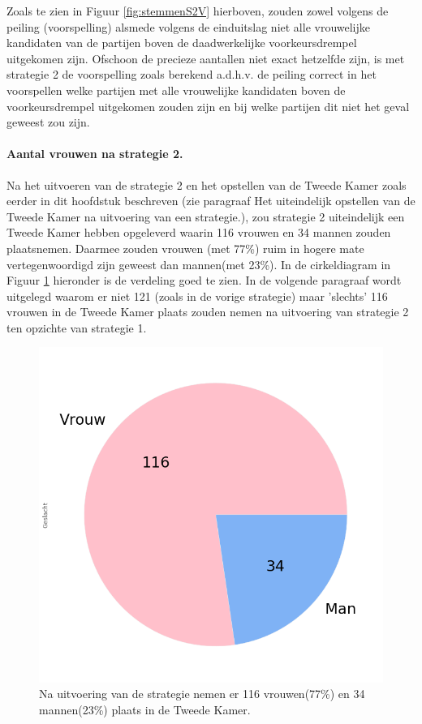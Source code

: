 Zoals te zien in Figuur \ref{fig:stemmenS2V}  hierboven, zouden zowel volgens de peiling (voorspelling) alsmede volgens de einduitslag niet alle vrouwelijke kandidaten van de partijen boven de daadwerkelijke voorkeursdrempel uitgekomen zijn. Ofschoon de precieze aantallen niet exact hetzelfde zijn, is met strategie 2 de voorspelling zoals berekend a.d.h.v. de peiling correct in het voorspellen welke partijen met alle vrouwelijke kandidaten boven de voorkeursdrempel uitgekomen zouden zijn en bij welke partijen dit niet het geval geweest zou zijn.




\paragraph{Aantal vrouwen na strategie 2.}
Na het uitvoeren van de strategie 2 en het opstellen van de Tweede Kamer zoals eerder in dit hoofdstuk beschreven (zie paragraaf Het uiteindelijk opstellen van de Tweede Kamer na uitvoering van een strategie.), zou strategie 2 uiteindelijk een Tweede Kamer hebben opgeleverd waarin 116 vrouwen en 34 mannen zouden plaatsnemen. Daarmee zouden vrouwen (met 77\%) ruim in hogere mate vertegenwoordigd zijn geweest dan mannen(met 23\%). In de cirkeldiagram in Figuur \ref{fig:pcS2V} hieronder is de verdeling goed te zien. In de volgende paragraaf wordt uitgelegd waarom er niet 121 (zoals in de vorige strategie) maar 'slechts' 116 vrouwen in de Tweede Kamer plaats zouden nemen na uitvoering van strategie 2 ten opzichte van strategie 1.

\begin{figure}[H]
\centering
	\includegraphics[width=0.35\linewidth]{pie_chart_willekeurig.png}

			\caption{Na uitvoering van de strategie nemen er 116 vrouwen(77\%) en 34 mannen(23\%) plaats in de Tweede Kamer.}

\label{fig:pcS2V}
\end{figure}

